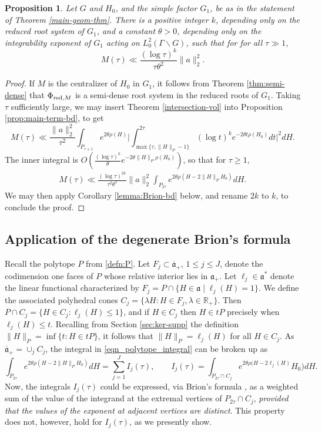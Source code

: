 \documentclass[12pt]{amsart}
\newtheorem{proposition}[theorem]{Proposition}
\theoremstyle{remark}
\newcommand{\R}{\mathbb R}
\newcommand{\ga}{\mathfrak a}
\begin{document}
\begin{proposition}\label{prop:M-tau}
Let $G$ and $H_0$, and the simple factor $G_1$, be as in the statement of Theorem \ref{main-geom-thm}. There is a positive integer $k$, depending only on the reduced root system of $G_1$, and a constant $\theta>0$, depending only on the integrability exponent of $G_1$ acting on $L^2_0(\Gamma\backslash G)$, such that for for all $\tau \gg 1$,
\[
M(\tau)\ll  \frac{(\log \tau)^k}{\tau \theta^2}\|a\|^2_2 .
\]
\end{proposition}
\begin{proof}
If $M$ is the centralizer of $H_0$ in $G_1$, it follows from Theorem \ref{thm:semi-dense} that $\Phi_{{\rm red},M}$ is a semi-dense root system in the reduced roots of $G_1$. Taking $\tau$ sufficiently large, we may insert Theorem \ref{intersection-vol} into Proposition \ref{prop:main-term-bd}, to get
\[
M(\tau)\ll \frac{\|a\|_2^2}{\tau^2}\int_{P_{\tau + 1}}  e^{2\theta\rho(H)}\Big| \int_{\max\{\tau, \|H\|_P - 1\}}^{2\tau}  (\log t)^k  e^{-2\theta t \rho(H_0)}dt \Big|^2 dH.
\]
The inner integral is $O(\frac{(\log \tau)^k}{\theta} e^{-2\theta \|H\|_P \rho(H_0)})$,
so that for $\tau \geq 1$,
\begin{gather} \label{eqn_polytope_integral}
M(\tau)\ll   \frac{(\log \tau)^{2k}}{\tau^2\theta^2}\|a\|^2_2  \int_{P_{2 \tau}} e^{2\theta\rho(H - 2 \|H\|_P H_0)} dH.
\end{gather}
We may then apply Corollary \ref{lemma:Brion-bd} below, and rename $2k$ to $k$, to conclude the proof.
\end{proof}

\subsection{Application of the degenerate Brion's formula}\label{sec:Brion}
Recall the polytope $P$ from \eqref{defn:P}. Let $F_j\subset\overline{\ga}_+$, $1\leq j\leq J$, denote the codimension one faces of $P$ whose relative interior lies in $\ga_+$. Let $\ell_j\in\ga^*$ denote the linear functional characterized by $F_j=P\cap\{H\in\ga\mid \ell_j(H)=1\}$. We define the associated polyhedral cones $C_j=\{\lambda H: H\in F_j, \lambda\in \R_+\}$. Then $P\cap C_j=\{H\in C_j: \ell_j(H)\leq 1\}$, and if $H\in C_j$ then $H\in tP$ precisely when $\ell_j(H)\leq t$. Recalling from Section \ref{sec:ker-supp} the definition $\|H\|_P= \inf \{t : H \in tP\}$, it follows that $\|H\|_P=\ell_j(H)$ for all $H\in C_j$. As $\overline{\ga}_+=\cup_j C_j$, the integral in \eqref{eqn_polytope_integral} can be broken up as
\[
\int_{P_{2 \tau}} e^{2\theta\rho(H - 2 \|H\|_P H_0)} dH=\sum_{j=1}^J I_j(\tau),\qquad I_j(\tau)=\int_{P_{2 \tau}\cap C_j} e^{2\theta\rho(H - 2 \ell_j(H)} H_0) dH.
\]
Now, the integrals $I_j(\tau)$ could be expressed, via Brion's formula \cite{Brion, Barvinok}, as a weighted sum of the value of the integrand at the extremal vertices of $P_{2 \tau}\cap C_j$, \textit{provided that the values of the exponent at adjacent vertices are distinct}. This property does not, however, hold for $I_j(\tau)$, as we presently show.
\end{document}
